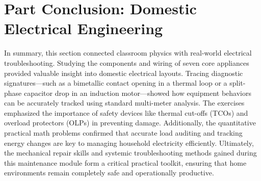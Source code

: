 \documentclass[11pt,a4paper]{report}
\begin{document}
\chapter*{Part Conclusion: Domestic Electrical Engineering}
In summary, this section connected classroom physics with real-world electrical troubleshooting. Studying the components and wiring of seven core appliances provided valuable insight into domestic electrical layouts. Tracing diagnostic signatures—such as a bimetallic contact opening in a thermal loop or a split-phase capacitor drop in an induction motor—showed how equipment behaviors can be accurately tracked using standard multi-meter analysis. The exercises emphasized the importance of safety devices like thermal cut-offs (TCOs) and overload protectors (OLPs) in preventing damage. Additionally, the quantitative practical math problems confirmed that accurate load auditing and tracking energy changes are key to managing household electricity efficiently. Ultimately, the mechanical repair skills and systemic troubleshooting methods gained during this maintenance module form a critical practical toolkit, ensuring that home environments remain completely safe and operationally productive.
\end{document}

